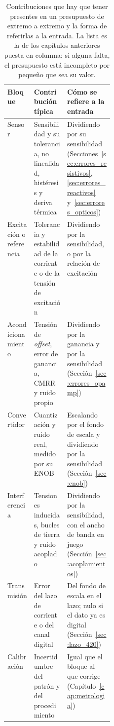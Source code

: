 \begin{table}[ht]
    \centering
    \small
    \setlength{\tabcolsep}{3pt}
    \forcerectofloat %
    \begin{tabularx}{\linewidth}{@{} L{0.25\linewidth} >{\centering\arraybackslash}X >{\centering\arraybackslash}X @{}}
        \toprule
        \textbf{Bloque} & \textbf{Contribución típica} & \textbf{Cómo se refiere a la entrada} \\
        \midrule
        Sensor & Sensibilidad y su tolerancia, no linealidad, histéresis y deriva térmica & Dividiendo por su sensibilidad (Secciones~\ref{sec:errores_resistivos}, \ref{sec:errores_reactivos} y~\ref{sec:errores_opticos}) \\
        Excitación o referencia & Tolerancia y estabilidad de la corriente o de la tensión de excitación & Dividiendo por la sensibilidad, o por la relación de excitación \\
        Acondicionamiento & Tensión de \emph{offset}, error de ganancia, CMRR y ruido propio & Dividiendo por la ganancia y por la sensibilidad (Sección~\ref{sec:errores_opamp}) \\
        Convertidor & Cuantización y ruido real, medido por su ENOB & Escalando por el fondo de escala y dividiendo por la sensibilidad (Sección~\ref{sec:enob}) \\
        Interferencia & Tensiones inducidas, bucles de tierra y ruido acoplado & Dividiendo por la sensibilidad, con el ancho de banda en juego (Sección~\ref{sec:acoplamientos}) \\
        Transmisión & Error del lazo de corriente o del canal digital & Del fondo de escala en el lazo; nulo si el dato ya es digital (Sección~\ref{sec:lazo_420}) \\
        Calibración & Incertidumbre del patrón y del procedimiento & Igual que el bloque al que corrige (Capítulo~\ref{cap:metrologia}) \\
        \bottomrule
    \end{tabularx}
    \caption[Contribuciones al presupuesto de errores de un sistema completo.]{Contribuciones que hay que tener presentes en un presupuesto de extremo a extremo y la forma de referirlas a la entrada. La lista es la de los capítulos anteriores puesta en columna: si alguna falta, el presupuesto está incompleto por pequeño que sea su valor.\protect\label{tab:contribuciones_error}}
\end{table}

